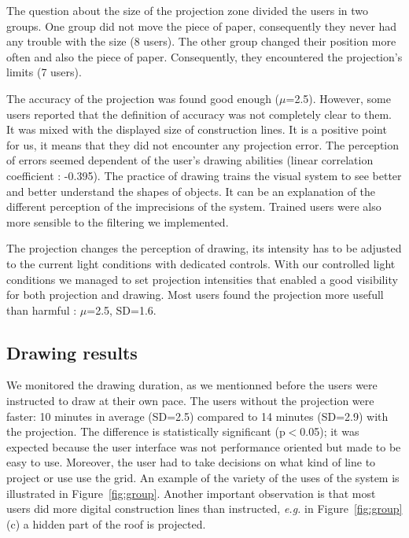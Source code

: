 \documentclass{sigchi}
\begin{document}
The question about the size of the projection zone divided the users
in two groups. One group did not move the piece of paper, consequently
they never had any trouble with the size (8 users). The other group
changed their position more often and also the piece of
paper. Consequently, they encountered the projection's limits (7
users). 

The accuracy of the projection was found good enough ($\mu$=2.5).
However, some users reported that the definition of accuracy was not
completely clear to them. It was mixed with the displayed size of
construction lines. It is a positive point for us, it means that they
did not encounter any projection error. 
The perception of errors seemed dependent of the user's drawing
abilities (linear correlation coefficient : -0.395). 
The practice of drawing trains the visual system to see better and
better understand the shapes of objects. It can be an explanation of
the different perception of the imprecisions of the system. 
Trained users were also more sensible to the filtering we implemented.

The projection changes the perception of drawing, its intensity has to
be adjusted to the current light conditions with dedicated controls. 
With our controlled light conditions we managed to set projection
intensities that enabled a good visibility for both projection and
drawing. Most users found the projection more usefull than harmful
: $\mu$=2.5, SD=1.6. 











\subsection{Drawing results}

We monitored the drawing duration, as we mentionned before the users were
instructed to draw at their own pace. The users without the projection
were faster: 10 minutes in average (SD=2.5) compared to 14 minutes (SD=2.9) with the
projection. The difference is statistically significant (p$<$0.05); it
was expected because the user interface was not performance oriented
but made to be easy to use. 
Moreover, the user had to take decisions on what kind of line to
project or use use the grid. An example of the variety of the uses of
the system is illustrated in Figure~\ref{fig:group}.
Another important observation is that most
users did more digital construction lines than instructed,
\textit{e.g.} in Figure~\ref{fig:group} (c) a hidden part of the roof is projected. 
\end{document}

